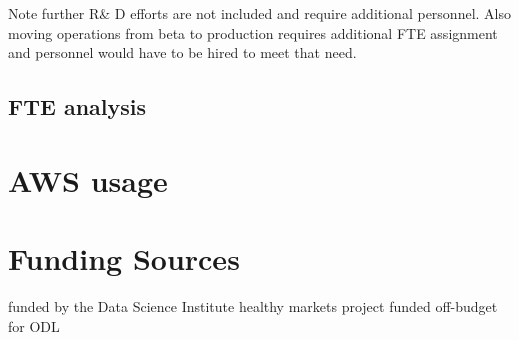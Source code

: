 Note further R\& D efforts are not included and require additional personnel. Also moving operations from beta to production requires additional FTE assignment and personnel would have to be hired to meet that need.

\subsection{FTE analysis}


\section{AWS usage}
\section{Funding Sources}
funded by the Data Science Institute
healthy markets project funded off-budget for ODL






